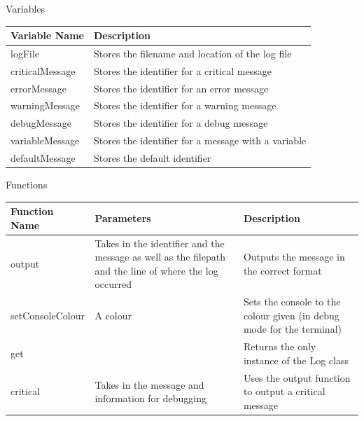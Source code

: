 \documentclass{article}
\begin{document}
                \begin{center}
                    Variables
                    \begin{tabular}{ | m{} | m{} | }
                        \hline
                        \textbf{Variable Name} & \textbf{Description} \\
                        \hline
                        logFile & Stores the filename and location of the log file \\
                        \hline
                        criticalMessage & Stores the identifier for a critical message \\
                        \hline
                        errorMessage & Stores the identifier for an error message \\
                        \hline
                        warningMessage & Stores the identifier for a warning message \\
                        \hline
                        debugMessage & Stores the identifier for a debug message \\
                        \hline
                        variableMessage & Stores the identifier for a message with a variable \\
                        \hline
                        defaultMessage & Stores the default identifier \\
                        \hline
                    \end{tabular}
                    Functions
                    \begin{tabular}{ | m{} | m{}| m{} | }
                        \hline
                        \textbf{Function Name} & \textbf{Parameters} & \textbf{Description} \\
                        \hline
                        output & Takes in the identifier and the message as well as the filepath and the line of where the log occurred & Outputs the message in the correct format \\
                        \hline
                        setConsoleColour & A colour & Sets the console to the colour given (in debug mode for the terminal) \\
                        \hline
                        get & & Returns the only instance of the Log class \\
                        \hline
                        critical & Takes in the message and information for debugging & Uses the output function to output a critical message \\

\end{tabular}
\end{center}
\end{document}
